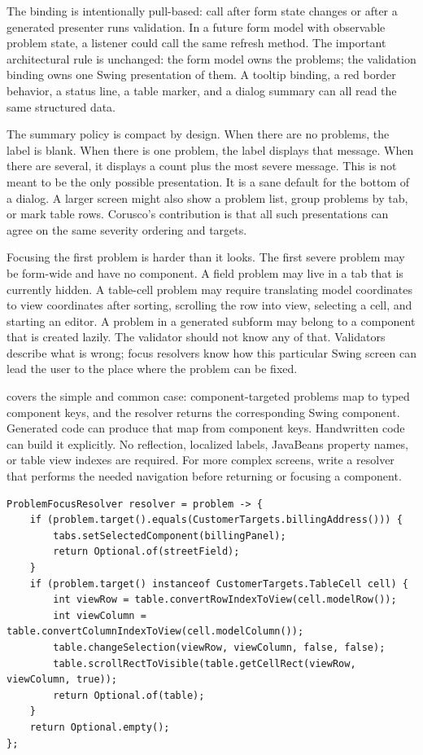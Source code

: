 The binding is intentionally pull-based: call  after form state
changes or after a generated presenter runs validation. In a future form model
with observable problem state, a listener could call the same refresh method.
The important architectural rule is unchanged: the form model owns the
problems; the validation binding owns one Swing presentation of them. A tooltip
binding, a red border behavior, a status line, a table marker, and a dialog
summary can all read the same structured data.

The summary policy is compact by design. When there are no problems, the label
is blank. When there is one problem, the label displays that message. When
there are several, it displays a count plus the most severe message. This is
not meant to be the only possible presentation. It is a sane default for the
bottom of a dialog. A larger screen might also show a problem list, group
problems by tab, or mark table rows. Corusco's contribution is that all such
presentations can agree on the same severity ordering and targets.

Focusing the first problem is harder than it looks. The first severe problem
may be form-wide and have no component. A field problem may live in a tab that
is currently hidden. A table-cell problem may require translating model
coordinates to view coordinates after sorting, scrolling the row into view,
selecting a cell, and starting an editor. A problem in a generated subform may
belong to a component that is created lazily. The validator should not know any
of that. Validators describe what is wrong; focus resolvers know how this
particular Swing screen can lead the user to the place where the problem can be
fixed.

 covers the simple and common case:
component-targeted problems map to typed component keys, and the resolver
returns the corresponding Swing component. Generated code can produce that map
from component keys. Handwritten code can build it explicitly. No reflection,
localized labels, JavaBeans property names, or table view indexes are required.
For more complex screens, write a resolver that performs the needed navigation
before returning or focusing a component.

\begin{lstlisting}[caption={A resolver for a tabbed form and a table cell.}]
ProblemFocusResolver resolver = problem -> {
    if (problem.target().equals(CustomerTargets.billingAddress())) {
        tabs.setSelectedComponent(billingPanel);
        return Optional.of(streetField);
    }
    if (problem.target() instanceof CustomerTargets.TableCell cell) {
        int viewRow = table.convertRowIndexToView(cell.modelRow());
        int viewColumn = table.convertColumnIndexToView(cell.modelColumn());
        table.changeSelection(viewRow, viewColumn, false, false);
        table.scrollRectToVisible(table.getCellRect(viewRow, viewColumn, true));
        return Optional.of(table);
    }
    return Optional.empty();
};
\end{lstlisting}

